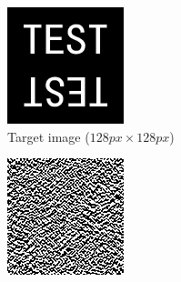 \begin{figure}[H]
  \centering
  \begin{subfigure}[t]{0.3\textwidth}
    \centering
    \includegraphics[width=\textwidth]{test_128.png}
    \caption{Target image ($128 px\times 128 px$)}
    \label{fig:test_128_SA}
  \end{subfigure}
  \hfill
  \begin{subfigure}[t]{0.3\textwidth}
    \centering
    \includegraphics[width=\textwidth]{SA_test_128_Holo.png}

\end{subfigure}
\end{figure}
